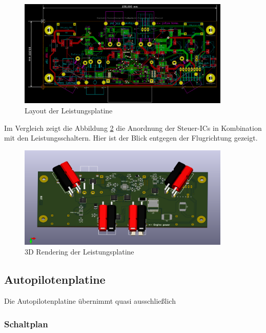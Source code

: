 \begin{figure}[H]
\centering
\includegraphics[width=0.9\textwidth]{bilder/Centerbox/Centerbox-Front-Power_AUVSI_2016_rev-01_layout.png} 
\caption{Layout der Leistungsplatine} 
\label{fig:Layout der Leistungsplatine}
\end{figure}

 Im Vergleich zeigt die Abbildung \ref{fig:3D Rendering der Leistungsplatinen Unterseite} die Anordnung der Steuer-ICs in Kombination mit den Leistungsschaltern. Hier ist der Blick entgegen der Flugrichtung gezeigt. 

\begin{figure}[H]
\centering
\includegraphics[width=0.9\textwidth]{bilder/Centerbox/Centerbox-Front-Power_AUVSI_2016_rev-01-3D.png} 
\caption{3D Rendering der Leistungsplatine} 
\label{fig:3D Rendering der Leistungsplatinen Unterseite}
\end{figure}

\subsection{Autopilotenplatine}

Die Autopilotenplatine übernimmt quasi ausschließlich

\subsubsection{Schaltplan}

